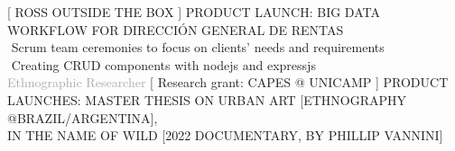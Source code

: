 \begin{cvtable}
%
	{[ R{\scriptsize OSS} O{\scriptsize UTSIDE THE} B{\scriptsize OX} ]}{
	 {\scriptsize PRODUCT LAUNCH: BIG DATA WORKFLOW FOR DIRECCIÓN GENERAL DE RENTAS} \\
        \textperiodcentered $ $ Scrum team ceremonies to focus on clients' needs and requirements \\
        \textperiodcentered $ $ Creating CRUD components with nodejs and expressjs \\
        }  
% 
	{%
	\textcolor{darkgray}{%
    Ethnographic Researcher
	}}
	{
    [ 
    Research grant:
    {C\scriptsize APES} @ {\scriptsize UNICAMP}
    ]%
	}
	{
{\scriptsize PRODUCT LAUNCHES:
MASTER THESIS ON URBAN ART [ETHNOGRAPHY @BRAZIL/ARGENTINA], \\
IN THE NAME OF WILD [2022 DOCUMENTARY, BY PHILLIP VANNINI]
} \\
}
\end{cvtable}
